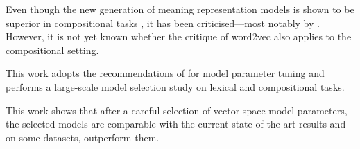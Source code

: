 Even though the new generation of meaning representation models is shown to be superior in compositional tasks \cite{milajevs-EtAl:2014:EMNLP2014}, it has been criticised---most notably by . However, it is not yet known whether the critique of word2vec also applies to the compositional setting.
%
%
%

This work adopts the recommendations of  for model parameter tuning and performs a large-scale model selection study on lexical and compositional tasks.
%
%

This work shows that after a careful selection of  vector space model
parameters, the selected models are comparable with the current state-of-the-art results and on some datasets, outperform them.
%
%
%

